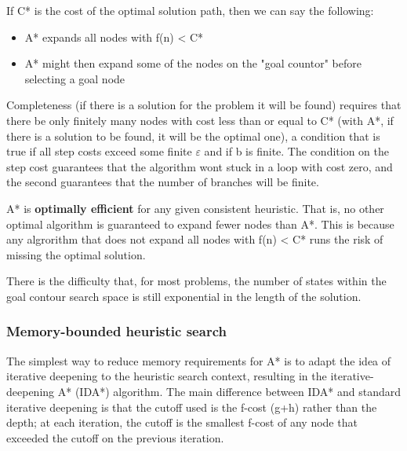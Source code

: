 \documentclass{article}
\begin{document}
If C* is the cost of the optimal solution path, then we can say the following:

\begin{itemize}
    \item A* expands all nodes with f(n) < C*
    \item A* might then expand some of the nodes on the "goal countor" before selecting a goal node
\end{itemize}

Completeness (if there is a solution for the problem it will be found) requires that there be only finitely many nodes with cost less than or equal to C* (with A*, if there is a solution to be found, it will be the optimal one), a condition that is true if all step costs exceed some finite $\varepsilon$ and if b is finite. The condition on the step cost guarantees that the algorithm wont stuck in a loop with cost zero, and the second guarantees that the number of branches will be finite.

A* is \textbf{optimally efficient} for any given consistent heuristic. That is, no other optimal algorithm is guaranteed to expand fewer nodes than A*. This is because any algrorithm that does not expand all nodes with f(n) < C* runs the risk of missing the optimal solution.

There is the difficulty that, for most problems, the number of states within the goal contour search space is still exponential in the length of the solution. 

\subsubsection{Memory-bounded heuristic search}

The simplest way to reduce memory requirements for A* is to adapt the idea of iterative deepening to the heuristic search context, resulting in the iterative-deepening A* (IDA*) algorithm. The main difference between IDA* and standard iterative deepening is that the cutoff used is the f-cost (g+h) rather than the depth; at each iteration, the cutoff is the smallest f-cost of any node that exceeded the cutoff on the previous iteration. 
\end{document}
